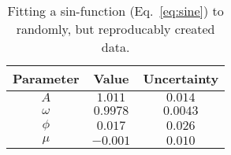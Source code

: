 \begin{table}
\centering
\caption{Fitting a sin-function (Eq.~\ref{eq:sine}) to randomly, but reproducably created data.}
\label{tab:sin_fit_x_y}
\begin{tabular}{ccc}
\hline\hline
Parameter & Value & Uncertainty \\
\hline
$A$ & $1.011$ & $0.014$ \\
$\omega$ & $0.9978$ & $0.0043$ \\
$\phi$ & $0.017$ & $0.026$ \\
$\mu$ & $-0.001$ & $0.010$ \\
\hline\hline
\end{tabular}
\end{table}
